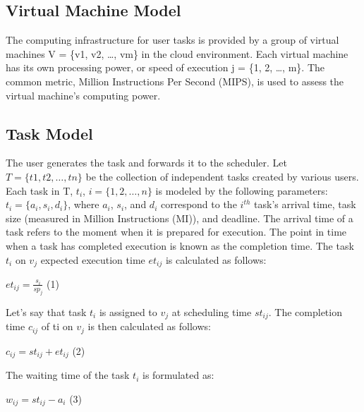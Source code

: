 \documentclass[conference]{IEEEtran}
\begin{document}
\subsection{Virtual Machine Model}
The computing infrastructure for user tasks is provided by a group of virtual machines V = \{v1, v2, \ldots, vm\}
 in the cloud environment. Each virtual machine has its own processing power, or speed of execution j = \{1, 2, \ldots, m\}. The common metric, Million Instructions Per Second (MIPS), is used to assess the virtual machine's computing power.

\subsection{Task Model}
The user generates the task and forwards it to the scheduler. Let $T = \{t1, t2, \ldots, tn\}$ be the collection of independent tasks created by various users.  Each task in T, $t_{i}$, $i = \{1, 2, \ldots, n\}$ is modeled by the following parameters: $t_{i} = \{a_{i}, s_{i}, d_{i}\}$, where $a_{i}$, $s_{i}$, and $d_{i}$ correspond to the $i^{th}$ task's arrival time, task size (measured in Million Instructions (MI)), and deadline. The arrival time of a task refers to the moment when it is prepared for execution. The point in time when a task has completed execution is known as the completion time. The task $t_{i}$ on $v_{j}$ expected execution time $et_{ij}$ is calculated as follows:

\begin{center}
    $et_{ij} = \frac{s_{i}}{sp_{j}}$  (1)
\end{center}

Let's say that task $t_{i}$ is assigned to $v_{j}$ at scheduling time $st_{ij}$. The completion time $c_{ij}$ of ti on $v_{j}$ is then calculated as follows:

\begin{center}
    $c_{ij} = st_{ij} + et_{ij}$  (2)
\end{center}

The waiting time of the task $t_{i}$ is formulated as:

\begin{center}
 $w_{ij} = st_{ij} - a_{i}$ (3)
\end{center}
\end{document}
